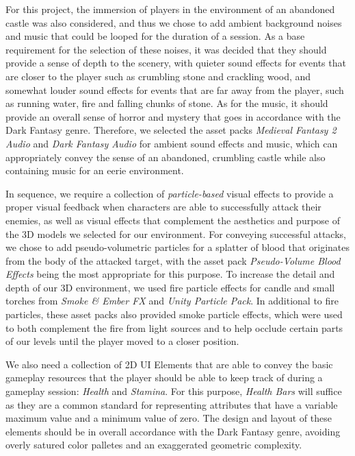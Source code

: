 For this project, the immersion of players in the environment of an abandoned castle was also considered, and thus we chose to add ambient background noises and music that could be looped for the duration of a session. As a base requirement for the selection of these noises, it was decided that they should provide a sense of depth to the scenery, with quieter sound effects for events that are closer to the player such as crumbling stone and crackling wood, and somewhat louder sound effects for events that are far away from the player, such as running water, fire and falling chunks of stone. As for the music, it should provide an overall sense of horror and mystery that goes in accordance with the Dark Fantasy genre. Therefore, we selected the asset packs \emph{Medieval Fantasy 2 Audio} and \emph{Dark Fantasy Audio} for ambient sound effects and music, which can appropriately convey the sense of an abandoned, crumbling castle while also containing music for an eerie environment.


In sequence, we require a collection of \emph{particle-based} visual effects to provide a proper visual feedback when characters are able to successfully attack their enemies, as well as visual effects that complement the aesthetics and purpose of the 3D models we selected for our environment. For conveying successful attacks, we chose to add pseudo-volumetric particles for a splatter of blood that originates from the body of the attacked target, with the asset pack \emph{Pseudo-Volume Blood Effects} being the most appropriate for this purpose. To increase the detail and depth of our 3D environment, we used fire particle effects for candle and small torches from \emph{Smoke \& Ember FX} and \emph{Unity Particle Pack}. In additional to fire particles, these asset packs also provided smoke particle effects, which were used to both complement the fire from light sources and to help occlude certain parts of our levels until the player moved to a closer position.

We also need a collection of 2D UI Elements that are able to convey the basic gameplay resources that the player should be able to keep track of during a gameplay session: \emph{Health} and \emph{Stamina}. For this purpose, \emph{Health Bars} will suffice as they are a common standard for representing attributes that have a variable maximum value and a minimum value of zero. The design and layout of these elements should be in overall accordance with the Dark Fantasy genre, avoiding overly satured color palletes and an exaggerated geometric complexity.


